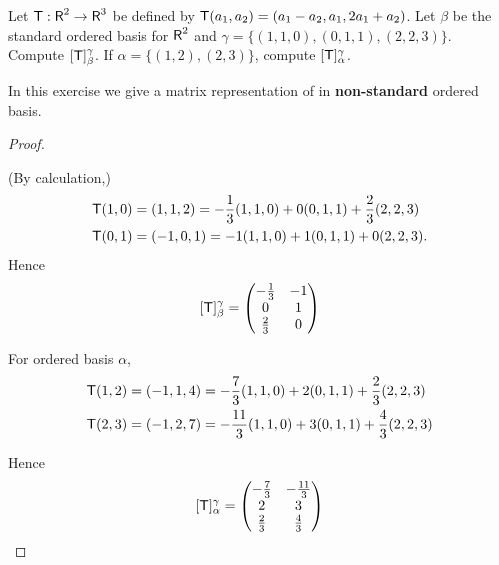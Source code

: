 \begin{exercise} \label{exercise 2.2.3}
Let \(\textsf{T} : \textsf{R}^2 \to \textsf{R}^3\) be defined by \(\textsf{T}(a_1, a_2) = (a_1 - a_2, a_1, 2a_1 + a_2)\).
Let \(\beta\) be the standard ordered basis for \(\textsf{R}^2\) and \(\gamma = \{ (1, 1, 0), (0, 1, 1) , (2, 2, 3) \}\).
Compute \([\textsf{T}]_{\beta}^{\gamma}\).
If \(\alpha = \{ (1, 2), (2, 3) \}\), compute \([\textsf{T}]_{\alpha}^{\gamma}\).
\end{exercise}

\begin{note}
In this exercise we give a matrix representation of \LTRAN{} in \textbf{non-standard} ordered basis.
\end{note}

\begin{proof} \ 

(By calculation,)
\begin{align*}
    \textsf{T}(1, 0) & = (1, 1, 2) = -\frac{1}{3}(1, 1, 0) + 0(0, 1, 1) + \frac{2}{3}(2, 2, 3) \\
    \textsf{T}(0, 1) & = (-1, 0, 1) = -1(1, 1, 0) + 1(0, 1, 1) + 0(2, 2, 3).
\end{align*}
Hence
\[
    [\textsf{T}]_{\beta}^{\gamma} = \begin{pmatrix} -\frac{1}{3} & -1 \\ 0 & 1 \\ \frac{2}{3} & 0 \end{pmatrix}
\]

For ordered basis \(\alpha\),
\begin{align*}
    \textsf{T}(1, 2) & = (-1, 1, 4) = -\frac{7}{3}(1, 1, 0) + 2(0, 1, 1) + \frac{2}{3}(2, 2, 3) \\
    \textsf{T}(2, 3) & = (-1, 2, 7) = -\frac{11}{3}(1, 1, 0) + 3(0, 1, 1) + \frac{4}{3}(2, 2, 3) \\
\end{align*}

Hence
\[
    [\textsf{T}]_{\alpha}^{\gamma} = \begin{pmatrix} -\frac{7}{3} & -\frac{11}{3} \\ 2 & 3 \\ \frac{2}{3} & \frac{4}{3} \end{pmatrix}
\]
\end{proof}

